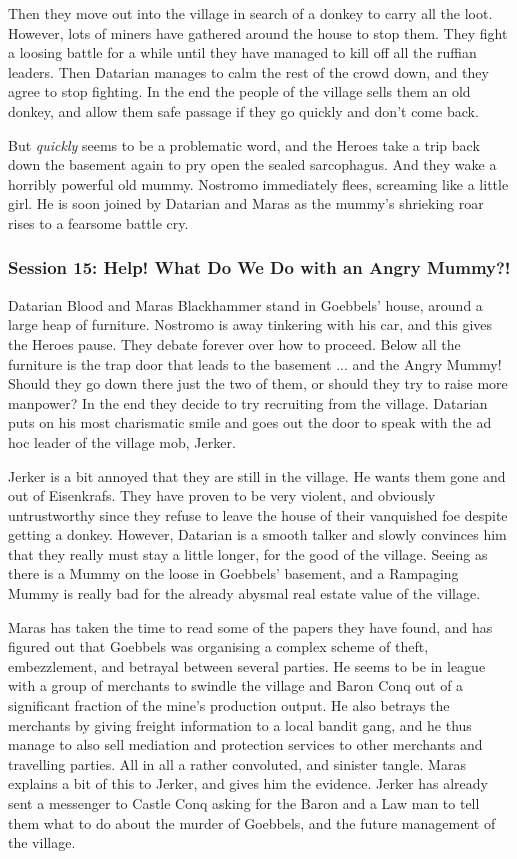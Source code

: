 Then they move out into the village in search of a donkey to carry all the loot. However, lots of miners have gathered around the house to stop them. They fight a loosing battle for a while until they have managed to kill off all the ruffian leaders. Then Datarian manages to calm the rest of the crowd down, and they agree to stop fighting.
In the end the people of the village sells them an old donkey, and allow them safe passage if they go quickly and don't come back.

But \emph{quickly} seems to be a problematic word, and the Heroes take a trip back down the basement again to pry open the sealed sarcophagus. And they wake a horribly powerful old mummy. Nostromo immediately flees, screaming like a little girl. He is soon joined by Datarian and Maras as the mummy's shrieking roar rises to a fearsome battle cry.


\subsubsection*{Session 15: Help! What Do We Do with an Angry Mummy?!}
Datarian Blood and Maras Blackhammer stand in Goebbels' house, around a large heap of furniture. Nostromo is away tinkering with his car, and this gives the Heroes pause. They debate forever over how to proceed. Below all the furniture is the trap door that leads to the basement ... and the Angry Mummy!
Should they go down there just the two of them, or should they try to raise more manpower? In the end they decide to try recruiting from the village. Datarian puts on his most charismatic smile and goes out the door to speak with the ad hoc leader of the village mob, Jerker.

Jerker is a bit annoyed that they are still in the village. He wants them gone and out of Eisenkrafs. They have proven to be very violent, and obviously untrustworthy since they refuse to leave the house of their vanquished foe despite getting a donkey. However, Datarian is a smooth talker and slowly convinces him that they really must stay a little longer, for the good of the village. Seeing as there is a Mummy on the loose in Goebbels' basement, and a Rampaging Mummy is really bad for the already abysmal real estate value of the village.

Maras has taken the time to read some of the papers they have found, and has figured out that Goebbels was organising a complex scheme of theft, embezzlement, and betrayal between several parties. He seems to be in league with a group of merchants to swindle the village and Baron Conq out of a significant fraction of the mine's production output. He also betrays the merchants by giving freight information to a local bandit gang, and he thus manage to also sell mediation and protection services to other merchants and travelling parties. All in all a rather convoluted, and sinister tangle.
Maras explains a bit of this to Jerker, and gives him the evidence. Jerker has already sent a messenger to Castle Conq asking for the Baron and a Law man to tell them what to do about the murder of Goebbels, and the future management of the village.


